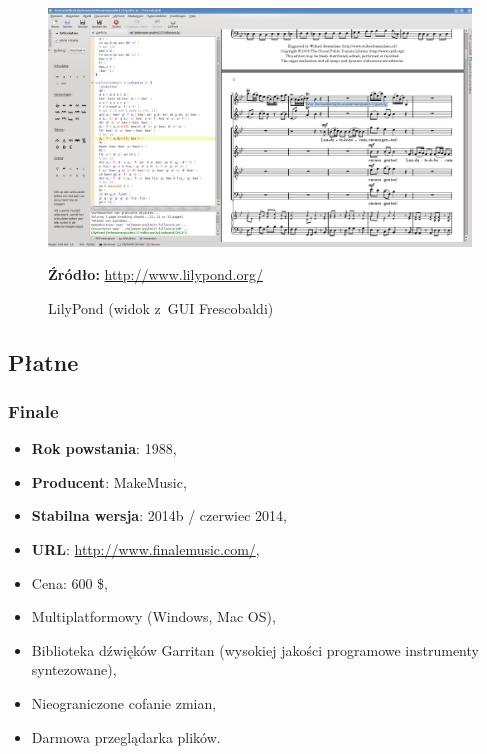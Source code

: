 \documentclass[polish,thesis,12pt]{dcsbook}
\newcommand{\source}[2]{
  	\caption*{\textbf{Źródło:} \href{#1}{{#2}}}
}
\begin{document}
\begin{figure}[H]
  \centering
  \includegraphics[scale=0.3,bb=0 0 1355 762]{img/lilypond.png}
  \caption{LilyPond (widok z~GUI Frescobaldi)}
  \label{lilypond}
  \source{http://www.lilypond.org/easier-editing.html}{http://www.lilypond.org/}
\end{figure}

\subsection{Płatne}
\subsubsection{Finale}
\begin{itemize}
  \item \textbf{Rok powstania}: 1988,
  \item \textbf{Producent}: MakeMusic,
  \item \textbf{Stabilna wersja}: 2014b / czerwiec 2014,
  \item \textbf{URL}: \url{http://www.finalemusic.com/},
  \item Cena: 600 \$,
  \item Multiplatformowy (Windows, Mac OS),
  \item Biblioteka dźwięków Garritan (wysokiej jakości programowe instrumenty syntezowane),
  \item Nieograniczone cofanie zmian,
  \item Darmowa przeglądarka plików.
\end{itemize}
\end{document}
